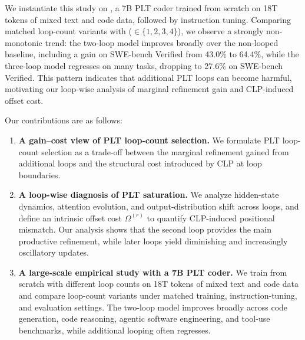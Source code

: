 
We instantiate this study on \modelname{}, a 7B PLT coder trained from scratch on 18T tokens of mixed text and code data, followed by instruction tuning. Comparing matched loop-count variants with (\loopcount $\in \{1,2,3,4\}$), we observe a strongly non-monotonic trend: the two-loop model improves broadly over the non-looped baseline, including a gain on SWE-bench Verified from 43.0\% to 64.4\%, while the three-loop model regresses on many tasks, dropping to 27.6\% on SWE-bench Verified. This pattern indicates that additional PLT loops can become harmful, motivating our loop-wise analysis of marginal refinement gain and CLP-induced offset cost.

Our contributions are as follows:

\begin{enumerate}
\item \textbf{A gain--cost view of PLT loop-count selection.}
We formulate PLT loop-count selection as a trade-off between the marginal refinement gained from additional loops and the structural cost introduced by CLP at loop boundaries.

\item \textbf{A loop-wise diagnosis of PLT saturation.}
We analyze hidden-state dynamics, attention evolution, and output-distribution shift across loops, and define an intrinsic offset cost $\Omega^{(r)}$ to quantify CLP-induced positional mismatch. Our analysis shows that the second loop provides the main productive refinement, while later loops yield diminishing and increasingly oscillatory updates.

\item \textbf{A large-scale empirical study with a 7B PLT coder.}
We train \modelname{} from scratch with different loop counts on 18T tokens of mixed text and code data and compare loop-count variants under matched training, instruction-tuning, and evaluation settings. The two-loop model improves broadly across code generation, code reasoning, agentic software engineering, and tool-use benchmarks, while additional looping often regresses.
\end{enumerate}

